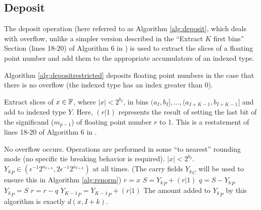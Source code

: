 \subsection{Deposit}
    \label{sec:primitiveops_deposit}
    The deposit operation (here referred to as Algorithm \ref{alg:deposit},
    which deals with overflow, unlike a simpler version described in the
    ``Extract $K$ first bins'' Section (lines 18-20) of Algorithm $6$ in
    \cite{repsum}) is used to extract the slices of a floating point number and
    add them to the appropriate accumulators of an indexed type.

    Algorithm \ref{alg:depositrestricted} deposits floating point numbers in
    the case that there is no overflow (the indexed type has an index greater
    than 0).

      \begin{samepage}
      \begin{alg}
        Extract slices of $x \in \mathbb{F}$, where $|x| < 2^{b_I}$, in bins $(a_I,
        b_I], ..., (a_{I + K - 1}, b_{I + K - 1}]$ and add to indexed type $Y$.
        Here, $(r | 1)$ represents the result of setting the last bit of the
        significand ($m_{p - 1}$) of floating point number $r$ to 1. This is a
        restatement of lines 18-20 of Algorithm $6$ in \cite{repsum}.
        \begin{algorithmic}[1]
          \Require
          \Statex No overflow occurs.
          \Statex Operations are performed in some ``to nearest'' rounding mode
          (no specific tie breaking behavior is required).
          \Statex $|x| < 2^{b_I}$.
          \Statex ${Y_k}_P \in (\epsilon^{-1}  2^{a_{I + k}}, 2  \epsilon^{-1}  2^{a_{I + k}})$ at all times.
          (The carry fields ${Y_k}_C$ will be used to ensure this in Algorithm \ref{alg:renorm})
            \State $r = x$ \label{alg:depositrestricted:rgetsx}
             \label{alg:depositrestricted:loop}
              \State $S = {Y_k}_P + (r | 1)$ \label{alg:depositrestricted:split}
              \State $q = S - {Y_k}_P$
              \State ${Y_k}_P = S$
              \State $r = r - q$\label{alg:depositrestricted:endsplit}
            \EndFor
            \State ${Y_{K - 1}}_P = {Y_{K - 1}}_P + (r | 1)$
          \EndFunction
          \Ensure
          \Statex The amount added to ${Y_k}_P$ by this algorithm is exactly $d(x, I + k)$.
        \end{algorithmic}
        \label{alg:depositrestricted}
      \end{alg}
      \end{samepage}


